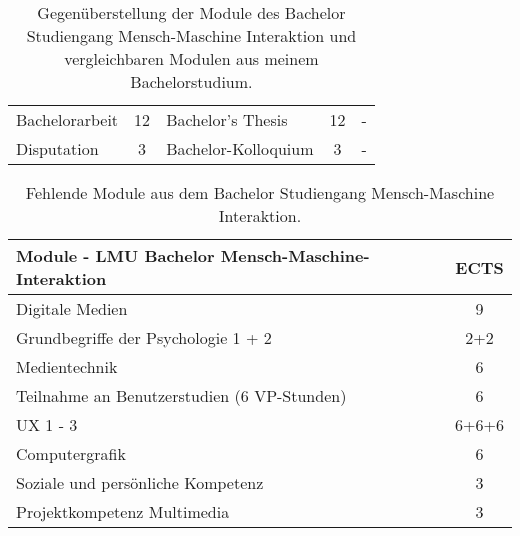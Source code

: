 \documentclass[11pt, a4paper]{awesome-cv}
\begin{document}
\begin{table*}
\begin{tabularx}{\textwidth}{|X|c|X|c|c|}
    Bachelorarbeit                                         & 12   & Bachelor's Thesis                              & 12   & -    \\

    \rowcolor{awesome!25}
    Disputation                                            & 3    & Bachelor-Kolloquium                            & 3    & -    \\
    \hline
  \end{tabularx}
  \label{table:1}
  \caption{Gegenüberstellung der Module des Bachelor Studiengang Mensch-Maschine Interaktion und vergleichbaren Modulen aus meinem Bachelorstudium.}
\end{table*}

\begin{table*}
  \scriptsize
  \centering
  \begin{tabularx}{.5\textwidth}{|X|c|}

    \hline
    Module - LMU Bachelor Mensch-Maschine-Interaktion & ECTS  \\
    \hline

    Digitale Medien                                   & 9     \\

    \rowcolor{awesome!25}
    Grundbegriffe der Psychologie 1 + 2               & 2+2   \\

    Medientechnik                                     & 6     \\

    \rowcolor{awesome!25}
    Teilnahme an Benutzerstudien (6 VP-Stunden)       & 6     \\

    UX 1 - 3                                          & 6+6+6 \\

    \rowcolor{awesome!25}
    Computergrafik                                    & 6     \\

    Soziale und persönliche Kompetenz                 & 3     \\

    \rowcolor{awesome!25}
    Projektkompetenz Multimedia                       & 3     \\
    \hline
  \end{tabularx}
  \label{table:2}
  \caption{Fehlende Module aus dem Bachelor Studiengang Mensch-Maschine Interaktion.}
\end{table*}
\end{document}
